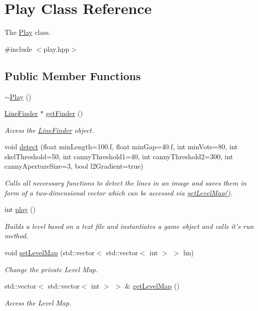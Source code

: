 \hypertarget{classPlay}{\section{Play Class Reference}
\label{classPlay}
}


The \hyperlink{classPlay}{Play} class.  




{\ttfamily \#include $<$play.\-hpp$>$}

\subsection*{Public Member Functions}
\begin{DoxyCompactItemize}
\item 
\hyperlink{classPlay_a6f7dd4d097454caef2e81fa94fe739d5}{$\sim$\-Play} ()
\item 
\hyperlink{classLineFinder}{Line\-Finder} $\ast$ \hyperlink{classPlay_ad610a2ec29110814e389192ca2277070}{get\-Finder} ()
\begin{DoxyCompactList}\small\item\em Access the \hyperlink{classLineFinder}{Line\-Finder} object. \end{DoxyCompactList}\item 
void \hyperlink{classPlay_af16a67caeafd129cbe43a87478ac3089}{detect} (float min\-Length=100.f, float min\-Gap=40.f, int min\-Vote=80, int skel\-Threshold=50, int canny\-Threshold1=40, int canny\-Threshold2=300, int canny\-Aperture\-Size=3, bool l2\-Gradient=true)
\begin{DoxyCompactList}\small\item\em Calls all neccessary functions to detect the lines in an image and saves them in form of a two-\/dimensional vector which can be accessed via \hyperlink{classPlay_a4c09a80f0f01539d9eb9f449c2362efa}{get\-Level\-Map()}. \end{DoxyCompactList}\item 
int \hyperlink{classPlay_a4ac2c0b79134c402b9a6c8135b08a665}{play} ()
\begin{DoxyCompactList}\small\item\em Builds a level based on a text file and instantiates a game object and calls it's run method. \end{DoxyCompactList}\item 
void \hyperlink{classPlay_a44510c78cf006fededeea6673932afd0}{set\-Level\-Map} (std\-::vector$<$ std\-::vector$<$ int $>$ $>$ lm)
\begin{DoxyCompactList}\small\item\em Change the private Level Map. \end{DoxyCompactList}\item 
std\-::vector$<$ std\-::vector$<$ int $>$ $>$ \& \hyperlink{classPlay_a4c09a80f0f01539d9eb9f449c2362efa}{get\-Level\-Map} ()
\begin{DoxyCompactList}\small\item\em Access the Level Map. \end{DoxyCompactList}\end{DoxyCompactItemize}
